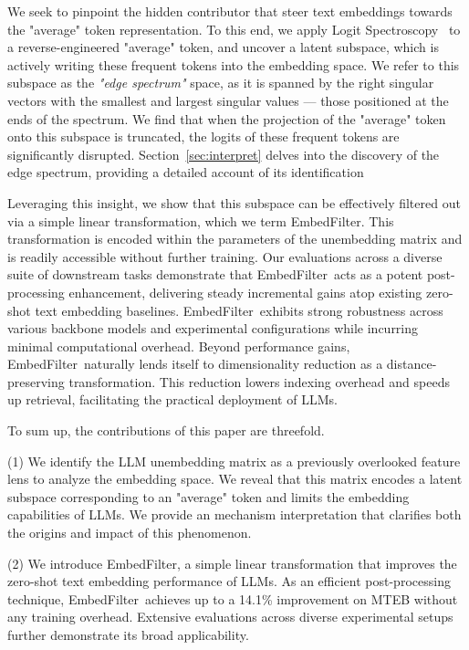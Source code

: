 \documentclass{llmxive}
\providecommand{\name}{EmbedFilter}
\begin{document}
We seek to pinpoint the hidden contributor that steer text embeddings towards the "average" token representation. 
To this end, we apply Logit Spectroscopy~\citep{spectral} to a reverse-engineered "average" token, and uncover a latent subspace, which is actively writing these frequent tokens into the embedding space.
We refer to this subspace as the \textit{"edge spectrum"} space, as it is spanned by the right singular vectors with the smallest and largest singular values --- those positioned at the ends of the spectrum.
We find that when the projection of the "average" token onto this subspace is truncated, the logits of these frequent tokens are significantly disrupted.
Section~\ref{sec:interpret} delves into the discovery of the edge spectrum, providing a detailed account of its identification

Leveraging this insight, we show that this subspace can be effectively filtered out via a simple linear transformation, which we term \name.
This transformation is encoded within the parameters of the unembedding matrix and is readily accessible without further training.
Our evaluations across a diverse suite of downstream tasks demonstrate that \name\ acts as a potent post-processing enhancement, delivering steady incremental gains atop existing zero-shot text embedding baselines.
\name\ exhibits strong robustness across various backbone models and experimental configurations while incurring minimal computational overhead.
Beyond performance gains, \name\ naturally lends itself to dimensionality reduction as a distance-preserving transformation.
This reduction lowers indexing overhead and speeds up retrieval, facilitating the practical deployment of LLMs.

To sum up, the contributions of this paper are threefold.

(1) We identify the LLM unembedding matrix as a previously overlooked feature lens to analyze the embedding space.
We reveal that this matrix encodes a latent subspace corresponding to an "average" token and limits the embedding capabilities of LLMs.
We provide an mechanism interpretation that clarifies both the origins and impact of this phenomenon.

(2) We introduce \name, a simple linear transformation that improves the zero-shot text embedding performance of LLMs.
As an efficient post-processing technique, \name\ achieves up to a 14.1\% improvement on MTEB without any training overhead. 
Extensive evaluations across diverse experimental setups further demonstrate its broad applicability.
\end{document}

